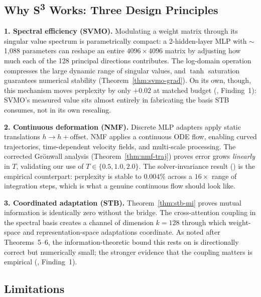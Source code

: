 \documentclass{scpe}
\newcommand{\svmo}{\textsc{SVMO}}
\newcommand{\nmf}{\textsc{NMF}}
\newcommand{\stb}{\textsc{STB}}
\newcommand{\sthree}{S\textsuperscript{3}}
\begin{document}
\subsection{Why \sthree{} Works: Three Design Principles}

\textbf{1. Spectral efficiency (\svmo).} Modulating a weight matrix through its singular value spectrum is parametrically compact: a 2-hidden-layer MLP with $\sim$1{,}088 parameters can reshape an entire $4096 \times 4096$ matrix by adjusting how much each of the 128 principal directions contributes. The log-domain operation compresses the large dynamic range of singular values, and $\tanh$ saturation guarantees numerical stability (Theorem~\ref{thm:svmo-grad}). On its own, though, this mechanism moves perplexity by only $+0.02$ at matched budget (, Finding~1): SVMO's measured value sits almost entirely in fabricating the basis STB consumes, not in its own rescaling.

\textbf{2. Continuous deformation (\nmf).} Discrete MLP adapters apply static translations $h \to h + \text{offset}$. NMF applies a continuous ODE flow, enabling curved trajectories, time-dependent velocity fields, and multi-scale processing. The corrected Gr\"onwall analysis (Theorem~\ref{thm:nmf-traj}) proves error grows \textit{linearly} in $T$, validating our use of $T \in \{0.5, 1.0, 2.0\}$. The solver-invariance result () is the empirical counterpart: perplexity is stable to $0.004\%$ across a $16\times$ range of integration steps, which is what a genuine continuous flow should look like.

\textbf{3. Coordinated adaptation (\stb).} Theorem~\ref{thm:stb-mi} proves mutual information is identically zero without the bridge. The cross-attention coupling in the spectral basis creates a channel of dimension $k=128$ through which weight-space and representation-space adaptations coordinate. As noted after Theorems~5--6, the information-theoretic bound this rests on is directionally correct but numerically small; the stronger evidence that the coupling matters is empirical (, Finding~1).

\subsection{Limitations}
\end{document}
